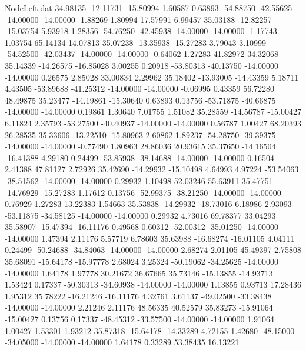 \begin{filecontents}{NodeLeft.dat}
  34.98135  -12.11731  -15.80994     1.60587    0.63893  -54.88750  -42.55625  -14.00000  -14.00000   -1.88269    1.80994   17.57991    6.99457
  35.03188  -12.82257  -15.03754     5.93918    1.28356  -54.76250  -42.45938  -14.00000  -14.00000   -1.17743    1.03754   65.14134   14.07813
  35.07238  -13.35938  -15.27283     3.79043    3.10999  -54.52500  -42.03437  -14.00000  -14.00000   -0.64062    1.27283   41.82972   34.32068
  35.14339  -14.26575  -16.85028     3.00255    0.20918  -53.80313  -40.13750  -14.00000  -14.00000    0.26575    2.85028   33.00834    2.29962
  35.18402  -13.93005  -14.43359     5.18711    4.43505  -53.89688  -41.25312  -14.00000  -14.00000   -0.06995    0.43359   56.72280   48.49875
  35.23477  -14.19861  -15.30640     0.63893    0.13756  -53.71875  -40.66875  -14.00000  -14.00000    0.19861    1.30640    7.01755    1.51082
  35.28559  -14.56787  -15.00427     6.11824    2.35793  -53.27500  -40.40937  -14.00000  -14.00000    0.56787    1.00427   68.20393   26.28535
  35.33606  -13.22510  -15.80963     2.60862    1.89237  -54.28750  -39.39375  -14.00000  -14.00000   -0.77490    1.80963   28.86036   20.93615
  35.37650  -14.16504  -16.41388     4.29180    0.24499  -53.85938  -38.14688  -14.00000  -14.00000    0.16504    2.41388   47.81127    2.72926
  35.42690  -14.29932  -15.10498     4.64993    4.97224  -53.54063  -38.51562  -14.00000  -14.00000    0.29932    1.10498   52.03246   55.63911
  35.47751  -14.76929  -15.27283     1.17612    0.13756  -52.99375  -38.21250  -14.00000  -14.00000    0.76929    1.27283   13.22383    1.54663
  35.53838  -14.29932  -18.73016     6.18986    2.93093  -53.11875  -34.58125  -14.00000  -14.00000    0.29932    4.73016   69.78377   33.04293
  35.58907  -15.47394  -16.11176     0.49568    0.60312  -52.00312  -35.01250  -14.00000  -14.00000    1.47394    2.11176    5.57719    6.78603
  35.63988  -16.68274  -16.01105     4.04111    0.24499  -50.24688  -34.84063  -14.00000  -14.00000    2.68274    2.01105   45.49397    2.75808
  35.68091  -15.64178  -15.97778     2.68024    3.25324  -50.19062  -34.25625  -14.00000  -14.00000    1.64178    1.97778   30.21672   36.67665
  35.73146  -15.13855  -14.93713     1.53424    0.17337  -50.30313  -34.60938  -14.00000  -14.00000    1.13855    0.93713   17.28436    1.95312
  35.78222  -16.21246  -16.11176     4.32761    3.61137  -49.02500  -33.38438  -14.00000  -14.00000    2.21246    2.11176   48.56335   40.52579
  35.83273  -15.91064  -15.00427     0.13756    0.17337  -48.45312  -33.57500  -14.00000  -14.00000    1.91064    1.00427    1.53301    1.93212
  35.87318  -15.64178  -14.33289     4.72155    1.42680  -48.15000  -34.05000  -14.00000  -14.00000    1.64178    0.33289   53.38435   16.13221

\end{filecontents}
